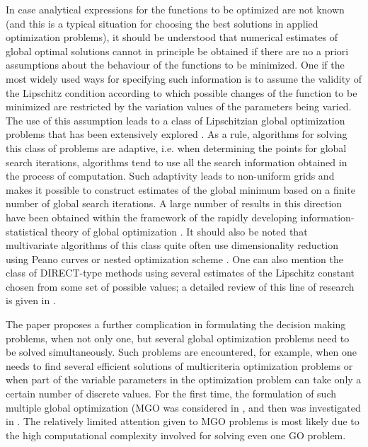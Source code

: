 \documentclass[review]{elsarticle}
\begin{document}
In case analytical expressions for the functions to be optimized are not known (and this is a typical situation for choosing the best solutions in applied optimization problems), it should be understood that numerical estimates of global optimal solutions cannot in principle be obtained if there are no a priori assumptions about the behaviour of the functions to be minimized. One if the most widely used ways for specifying such information is to assume the validity of the Lipschitz condition according to which possible changes of the function to be minimized are restricted by the variation values of the parameters being varied. The use of this assumption leads to a class of Lipschitzian global optimization problems that has been extensively explored \cite{c3,c6,c7,c19,c19,c20,c21,c22,c23}.  As a rule, algorithms for solving this class of problems are adaptive, i.e. when determining the points for global search iterations, algorithms tend to use all the search information obtained in the process of computation. Such adaptivity leads to non-uniform grids and makes it possible to construct estimates of the global minimum based on a finite number of global search iterations. A large number of results in this direction have been obtained within the framework of the rapidly developing information-statistical theory of global optimization \cite{c6}. It should also be noted that multivariate algorithms of this class quite often use dimensionality reduction using Peano curves or nested optimization scheme \cite{c23}. One can also mention the class of DIRECT-type methods using several estimates of the Lipschitz constant chosen from some set of possible values; a detailed review of this line of research is given in \cite{c22}.


The paper proposes a further complication in formulating the decision making problems, when not only one, but several global optimization problems need to be solved simultaneously. Such problems are encountered, for example, when one needs to find several efficient solutions of multicriteria optimization problems or when part of the variable parameters in the optimization problem can take only a certain number of discrete values. For the first time, the formulation of such multiple global optimization (MGO was considered in \cite{c25,c26}, and then was investigated in \cite{c27,c28}. The relatively limited attention given to MGO problems is most likely due to the high computational complexity involved for solving even one GO problem.
\end{document}
